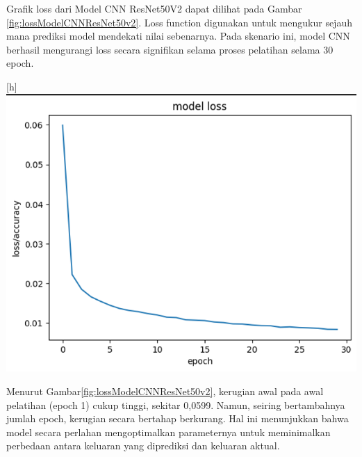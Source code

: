 Grafik loss dari Model CNN ResNet50V2 dapat dilihat pada Gambar \ref{fig:lossModelCNNResNet50v2}. Loss function digunakan untuk mengukur sejauh mana prediksi model mendekati nilai sebenarnya. Pada skenario ini, model CNN berhasil mengurangi loss secara signifikan selama proses pelatihan selama 30 epoch.

\begin{center}[h]
	\includegraphics[width=0.7\linewidth]{gambar/bener/Loss_ModelCNNResNet50V2.png}
	\label{fig:lossModelCNNResNet50v2}
\end{center}

Menurut Gambar\ref{fig:lossModelCNNResNet50v2}, kerugian awal pada awal pelatihan (epoch 1) cukup tinggi, sekitar 0,0599. Namun, seiring bertambahnya jumlah epoch, kerugian secara bertahap berkurang. Hal ini menunjukkan bahwa model secara perlahan mengoptimalkan parameternya untuk meminimalkan perbedaan antara keluaran yang diprediksi dan keluaran aktual.

